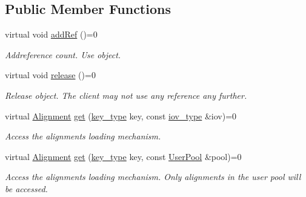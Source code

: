 \subsection*{Public Member Functions}
\begin{DoxyCompactItemize}
\item 
virtual void \hyperlink{class_d_d4hep_1_1_alignments_1_1_alignments_loader_a47a4586ac933395c27b705939985f41f}{add\+Ref} ()=0
\begin{DoxyCompactList}\small\item\em Addreference count. Use object. \end{DoxyCompactList}\item 
virtual void \hyperlink{class_d_d4hep_1_1_alignments_1_1_alignments_loader_acebda57b7dc5288116e7162dda92b65e}{release} ()=0
\begin{DoxyCompactList}\small\item\em Release object. The client may not use any reference any further. \end{DoxyCompactList}\item 
virtual \hyperlink{class_d_d4hep_1_1_alignments_1_1_alignment}{Alignment} \hyperlink{class_d_d4hep_1_1_alignments_1_1_alignments_loader_a26866df09d8670f134fc0895444f1675}{get} (\hyperlink{class_d_d4hep_1_1_alignments_1_1_alignments_loader_af56e6294e72dacbe001c1f24b8381d5d}{key\+\_\+type} key, const \hyperlink{class_d_d4hep_1_1_alignments_1_1_alignments_loader_a632271e6cb9198528a0826d9082561d1}{iov\+\_\+type} \&iov)=0
\begin{DoxyCompactList}\small\item\em Access the alignments loading mechanism. \end{DoxyCompactList}\item 
virtual \hyperlink{class_d_d4hep_1_1_alignments_1_1_alignment}{Alignment} \hyperlink{class_d_d4hep_1_1_alignments_1_1_alignments_loader_a19ca11e6b9485acd5797d509ea5b4b97}{get} (\hyperlink{class_d_d4hep_1_1_alignments_1_1_alignments_loader_af56e6294e72dacbe001c1f24b8381d5d}{key\+\_\+type} key, const \hyperlink{class_d_d4hep_1_1_conditions_1_1_user_pool}{User\+Pool} \&pool)=0
\begin{DoxyCompactList}\small\item\em Access the alignments loading mechanism. Only alignments in the user pool will be accessed. \end{DoxyCompactList}\end{DoxyCompactItemize}
